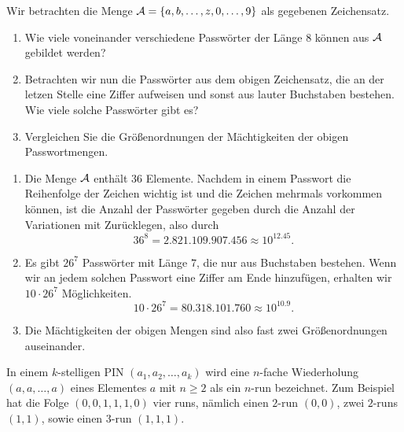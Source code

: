  Wir betrachten die Menge
$\mathcal A = \left\{ a, b, \dots, z, 0, \dots, 9 \right\}$ als gegebenen Zeichensatz.
\begin{enumerate}
    \item Wie viele voneinander verschiedene Passwörter der Länge 8 können
        aus $\mathcal A$ gebildet werden?
    \item Betrachten wir nun die Passwörter aus dem obigen Zeichensatz, die an der
        letzen Stelle eine Ziffer aufweisen und sonst aus lauter Buchstaben bestehen.
        Wie viele solche Passwörter gibt es?
    \item Vergleichen Sie die Größenordnungen der Mächtigkeiten der obigen
        Passwortmengen. 
\end{enumerate}

\solution 
\begin{enumerate}
    \item Die Menge $\mathcal A$ enthält $36$ Elemente. Nachdem in einem Passwort die
        Reihenfolge der Zeichen wichtig ist und die Zeichen mehrmals vorkommen
        können, ist die Anzahl der Passwörter gegeben durch die Anzahl der
        Variationen mit Zurücklegen, also durch
        \begin{equation}
            36^{8} = 2.821.109.907.456 \approx 10^{12.45}.
        \end{equation}
    \item Es gibt $26^7$ Passwörter mit Länge $7$, die nur aus Buchstaben bestehen. 
        Wenn wir an jedem solchen Passwort eine Ziffer am Ende hinzufügen, 
        erhalten wir $10\cdot 26^7$ Möglichkeiten. 
        \begin{equation}
            10\cdot 26^7 = 80.318.101.760 \approx 10^{10.9}.
        \end{equation}
    \item Die Mächtigkeiten der obigen Mengen sind also fast zwei Größenordnungen 
        auseinander.
\end{enumerate}



In einem $k$-stelligen PIN $(a_1,a_2,\dots ,a_k)$ wird eine $n$-fache
Wiederholung $(a,a,\dots ,a)$ eines Elementes $a$ mit $n\geq 2$ als ein $n$-run
bezeichnet.  Zum Beispiel hat die Folge $(0, 0, 1, 1, 1, 0)$ vier runs, nämlich
einen $2$-run $(0,0)$, zwei $2$-runs $(1,1)$, sowie einen $3$-run $(1,1,1)$.

